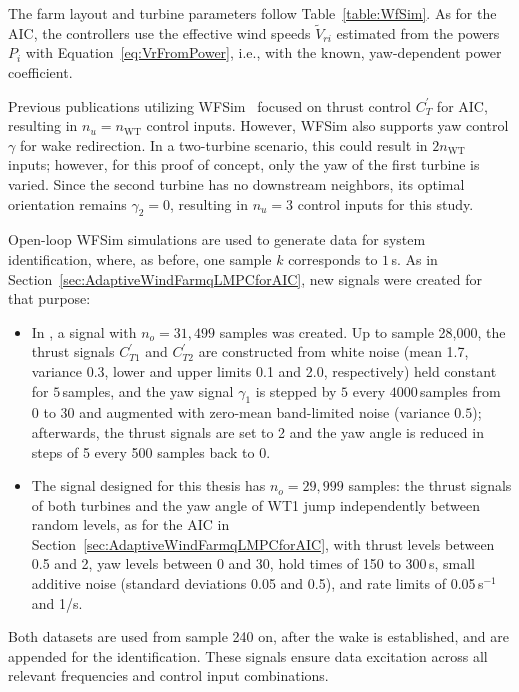 The farm layout and turbine parameters follow Table~\ref{table:WfSim}. As for the AIC, the controllers use the effective wind speeds $\tilde{V}_{ri}$ estimated from the powers $P_i$ with Equation~\eqref{eq:VrFromPower}, i.e., with the known, yaw-dependent power coefficient.

Previous publications utilizing WFSim~\cite{boersma2017tutorial,doekemeijer2018online, sharan2022Koopman, dittmer2022data} focused on thrust control $C_T^{\prime}$ for AIC, resulting in $n_u = n_{\text{WT}}$ control inputs. However, WFSim also supports yaw control $\gamma$ for wake redirection. In a two-turbine scenario, this could result in $2n_{\text{WT}}$ inputs; however, for this proof of concept, only the yaw of the first turbine is varied. Since the second turbine has no downstream neighbors, its optimal orientation remains $\gamma_2 = 0$\textdegree{}, resulting in $n_u = 3$ control inputs for this study.

Open-loop WFSim simulations are used to generate data for system identification, where, as before, one sample $k$ corresponds to $1$\,s. As in Section~\ref{sec:AdaptiveWindFarmqLMPCforAIC}, new signals were created for that purpose:
\begin{itemize}
    \item In \cite{dittmer2023koopman}, a signal with $n_o = 31{,}499$ samples was created. Up to sample 28,000, the thrust signals $C_{T1}^{\prime}$ and $C_{T2}^{\prime}$ are constructed from white noise (mean 1.7, variance 0.3, lower and upper limits 0.1 and 2.0, respectively) held constant for $5$\,samples, and the yaw signal $\gamma_1$ is stepped by $5$\textdegree{} every $4000$\,samples from $0$\textdegree{} to $30$\textdegree{} and augmented with zero-mean band-limited noise (variance $0.5$\textdegree{}); afterwards, the thrust signals are set to 2 and the yaw angle is reduced in steps of 5\textdegree{} every 500 samples back to 0\textdegree{}. 
    \item The signal designed for this thesis has $n_o = 29{,}999$ samples: the thrust signals of both turbines and the yaw angle of WT1 jump independently between random levels, as for the AIC in Section~\ref{sec:AdaptiveWindFarmqLMPCforAIC}, with thrust levels between 0.5 and 2, yaw levels between 0\textdegree{} and 30\textdegree{}, hold times of 150 to 300\,s, small additive noise (standard deviations 0.05 and 0.5\textdegree{}), and rate limits of 0.05\,s$^{-1}$ and 1\textdegree/s.
\end{itemize}
Both datasets are used from sample 240 on, after the wake is established, and are appended for the identification. These signals ensure data excitation across all relevant frequencies and control input combinations.

